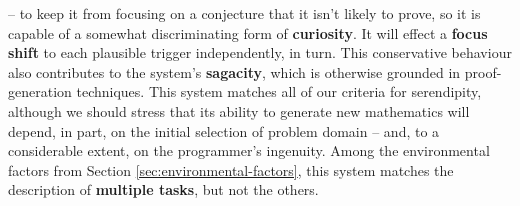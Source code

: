 \cite[p.~193]{colton2007computational} -- to keep it from focusing on
a conjecture that it isn't likely to prove, so it is capable of a
somewhat discriminating form of \textbf{curiosity}.  It will effect a
\textbf{focus shift} to each plausible trigger independently, in turn.
This conservative behaviour also contributes to the system's
\textbf{sagacity}, which is otherwise grounded in proof-generation
techniques.  This system matches all of our criteria for serendipity,
although we should stress that its ability to generate new mathematics
will depend, in part, on the initial selection of problem domain --
and, to a considerable extent, on the programmer's ingenuity.  Among
the environmental factors from Section
\ref{sec:environmental-factors}, this system matches the description
of \textbf{multiple tasks}, but not the others.
